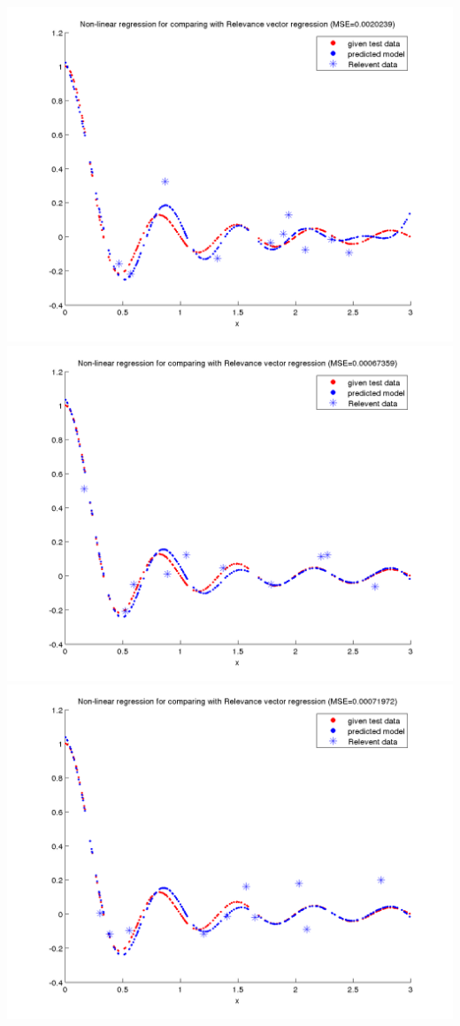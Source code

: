 \documentclass[fleqn]{article}
\begin{document}
\includegraphics[scale=0.4]{./pics/task5/non-linear-regression- rvr-random-3.png}
\includegraphics[scale=0.4]{./pics/task5/non-linear-regression- rvr-random-4.png}
\includegraphics[scale=0.4]{./pics/task5/non-linear-regression- rvr-random-5.png}
\end{document}
